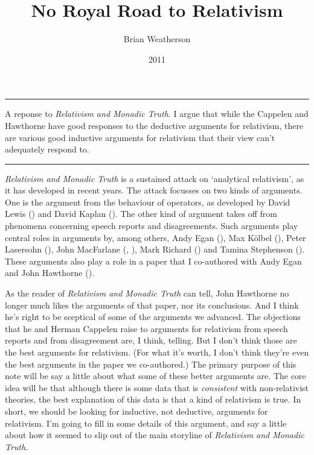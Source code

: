 \documentclass[
  10pt,
  letterpaper,
  DIV=11,
  numbers=noendperiod,
  twoside]{scrartcl}
\title{No Royal Road to Relativism}
\author{Brian Weatherson}
\date{2011}
\renewenvironment{abstract}
 {\vspace{-1.25cm}
 \quotation\small\noindent\rule{\linewidth}{.5pt}\par\smallskip
 \noindent }
 {\par\noindent\rule{\linewidth}{.5pt}\endquotation}
\begin{document}
\maketitle
\begin{abstract}
A reponse to \emph{Relativism and Monadic Truth}. I argue that while the
Cappelen and Hawthorne have good responses to the deductive arguments
for relativism, there are various good inductive arguments for
relativism that their view can't adequately respond to.
\end{abstract}


\emph{Relativism and Monadic Truth} is a sustained attack on `analytical
relativism', as it has developed in recent years. The attack focusses on
two kinds of arguments. One is the argument from the behaviour of
operators, as developed by David Lewis ()
and David Kaplan (). The other kind
of argument takes off from phenomena concerning speech reports and
disagreements. Such arguments play central roles in arguments by, among
others, Andy Egan (), Max Kölbel
(), Peter Lasersohn
(), John MacFarlane
(,
), Mark Richard
() and Tamina Stephenson
(). These arguments also play
a role in a paper that I co-authored with Andy Egan and John Hawthorne
().

As the reader of \emph{Relativism and Monadic Truth} can tell, John
Hawthorne no longer much likes the arguments of that paper, nor its
conclusions. And I think he's right to be sceptical of some of the
arguments we advanced. The objections that he and Herman Cappelen raise
to arguments for relativism from speech reports and from disagreement
are, I think, telling. But I don't think those are the best arguments
for relativism. (For what it's worth, I don't think they're even the
best arguments in the paper we co-authored.) The primary purpose of this
note will be say a little about what some of these better arguments are.
The core idea will be that although there is some data that is
\emph{consistent} with non-relativist theories, the best explanation of
this data is that a kind of relativism is true. In short, we should be
looking for inductive, not deductive, arguments for relativism. I'm
going to fill in some details of this argument, and say a little about
how it seemed to slip out of the main storyline of \emph{Relativism and
Monadic Truth}.
\end{document}
